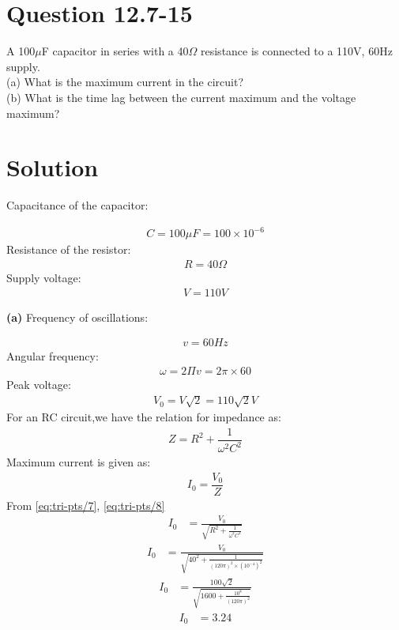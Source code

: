 \documentclass[journal,12pt,twocolumn]{IEEEtran}
\theoremstyle{remark}
\begin{document}
\section{Question 12.7-15}
A 100$\mu$F capacitor in series with a 40$\Omega$ resistance is
connected to a 110V, 60Hz supply.\\
(a) What is the maximum current in the circuit?\\
(b) What is the time lag between the current maximum and the voltage maximum?\\
\section{Solution}\begin{flushleft}
Capacitance of the capacitor:
\end{flushleft}
\begin{align}
\label{eq:tri-pts/1}C=100\mu F =100 \times 10^{-6}
\end{align}
Resistance of the resistor:
\begin{align}
\label{eq:tri-pts/2}R=40\Omega
\end{align}
Supply voltage:
\begin{align}
\label{eq:tri-pts/3}V=110V
\end{align}

\begin{flushleft}
\textbf{(a)} Frequency of oscillations:
\end{flushleft}
\begin{align}
\label{eq:tri-pts/4}v=60Hz
\end{align}
Angular frequency:
\begin{align}
\label{eq:tri-pts/5} \omega =2\Pi v =2\pi \times 60
\end{align}
Peak voltage:
\begin{align}
\label{eq:tri-pts/6}V_0=V\sqrt{2}=110\sqrt{2}V
\end{align}
For an RC circuit,we have the relation for impedance as:
\begin{align}
	\label{eq:tri-pts/7} Z=R^2 + \dfrac{1}{\omega^2C^2}
\end{align}
Maximum current is given as:
\begin{align}
\label{eq:tri-pts/8}I_0=\dfrac{V_0}{Z}
\end{align}
From \eqref{eq:tri-pts/7}, \eqref{eq:tri-pts/8}\\
\begin{align}
	\label{eq:tri-pts/9}I_0 &=\frac{V_0}{\sqrt{R^2 + \frac{1}{\omega^2C^2}}}
\end{align}
\begin{align}
	\label{eq:tri-pts/10}I_0 &=\frac{V_0}{\sqrt{40^2 + \frac{1}{{(120\pi)^2 \times (10^{-4})^2}}}}
\end{align}
\begin{align}
	\label{eq:tri-pts/11}I_0 &=\frac{100\sqrt{2}}{\sqrt{1600+\frac{10^8}{(120\pi)^2}}}
\end{align}
\begin{align}
	\label{eq:tri-pts/12}I_0 &=3.24
\end{align}
\\
\end{document}
